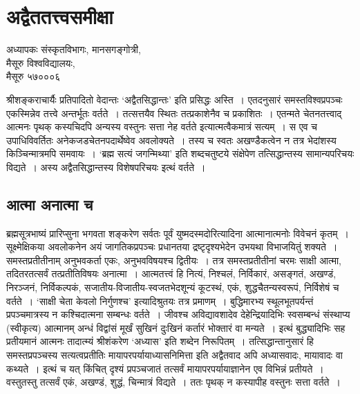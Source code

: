 {\fontsize{15}{17}\selectfont
\presetvalues
\chapter{अद्वैततत्त्वसमीक्षा}

\begin{center}
\smallskip
अध्यापकः संस्कृतविभागः, मानसगङ्गोत्री,\\
मैसूरु विश्वविद्यालयः,\\
मैसूरु ५७०००६
\addrule
\end{center}
श्रीशङ्कराचार्यैः प्रतिपादितो वेदान्तः ‘अद्वैतसिद्धान्तः’ इति प्रसिद्धः अस्ति~। एतदनुसारं समस्तविश्वप्रपञ्चः एकस्मिन्नेव तत्त्वे अन्तर्भूतः वर्तते~। तत्सत्तयैव स्थितः तत्प्रकाशेनैव च प्रकाशितः~। एतन्मते चेतनतत्त्वाद् आत्मनः पृथक् कस्यचिदपि अन्यस्य वस्तुनः सत्ता नेह वर्तते इत्यात्मत्वैकमात्रं सत्यम्~। स एव च उपाधिविवर्तितः अनेकजडचेतनपदार्थेष्वेव अवलोक्यते~। तस्य च स्वतः अखण्डैकत्वेन न तत्र भेदांशस्य किञ्चिन्मात्रमपि समवायः~। ‘ब्रह्म सत्यं जगन्मिथ्या’ इति शब्दचतुष्टये संक्षेपेण तत्सिद्धान्तस्य सामान्यपरिचयः विद्यते~। अस्य अद्वैतसिद्धान्तस्य विशेषपरिचयः इत्थं वर्तते~। 

\section*{आत्मा अनात्मा च}

ब्रह्मसूत्रभाष्यं प्रारिप्सुना भगवता शङ्करेण सर्वतः पूर्वं युष्मदस्मदोरित्यादिना आत्मानात्मनोः विवेचनं कृतम्~। सूक्ष्मेक्षिकया अवलोकनेन अयं जागतिकप्रपञ्चः प्रधानतया द्रष्टृदृश्यभेदेन उभयथा विभाजयितुं शक्यते~। समस्तप्रतीतीनाम् अनुभवकर्ता एकः, अनुभवविषयश्च द्वितीयः~। तत्र समस्तप्रतीतीनां चरमः साक्षी आत्मा, तदितरतत्सर्वं तत्प्रतीतिविषयः अनात्मा~। आत्मतत्त्वं हि नित्यं, निश्चलं, निर्विकारं, असङ्गतं, अखण्डं, निरञ्जनं, निर्विकल्पकं, सजातीय-विजातीय-स्वजतभेदशून्यं कूटस्थं, एकं, शुद्धचैतन्यस्वरूपं, निर्विशेषं च वर्तते~। ‘साक्षी चेता केवलो निर्गुणश्च’ इत्यादिश्रुतयः तत्र प्रमाणम्~। बुद्धिमारभ्य स्थूलभूतपर्यन्तं प्रपञ्चमात्रस्य न कश्चिदात्मना सम्बन्धः वर्तते~। जीवश्च अविद्यावशादेव देहेन्द्रियादिभिः स्वसम्बन्धं संस्थाप्य (स्वीकृत्य) आत्मानम् अन्धं विद्वांसं मूर्खं सुखिनं दुःखिनं कर्तारं भोक्तारं वा मन्यते~। इत्थं बुद्ध्यादिभिः सह प्रतीयमानं आत्मनः तादात्म्यं श्रीशंकरेण ‘अध्यास’ इति शब्देन निरूपितम्~। तत्सिद्धान्तानुसारं हि समस्तप्रपञ्चस्य सत्यत्वप्रतीतिः मायापरपर्यायाध्यासनिमित्ता इति अद्वैतवाद अपि अध्यासवादः, मायावादः वा कथ्यते~। इत्थं च यत् किंचित् दृश्यं प्रपञ्चजातं तत्सर्वं मायापरपर्यायाज्ञानेन एव विभिन्नं प्रतीयते~। वस्तुतस्तु तत्सर्वं एकं, अखण्डं, शुद्धं, चिन्मात्रं विद्यते~। ततः पृथक् न कस्यापीह वस्तुनः सत्ता वर्तते~। 

}
